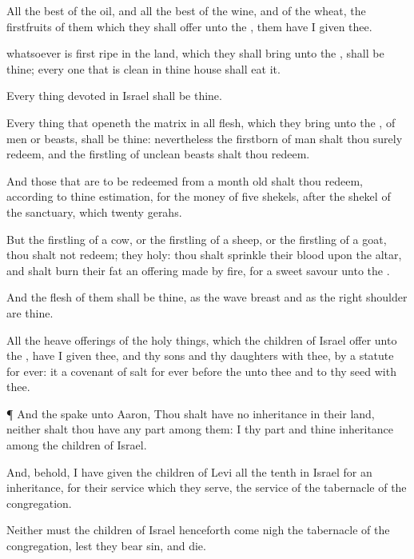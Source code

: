 {All the
best of the
oil, and all the
best of the
wine, and of the
wheat, the
firstfruits of them which they shall
offer unto the
{}, them have I
given thee.

 whatsoever is first
ripe in the
land, which they shall
bring unto the
{}, shall be thine; every one that is
clean in thine
house shall
eat
{} it.

Every thing
devoted in
Israel shall be thine.

Every thing that
openeth the
matrix in all
flesh, which they
bring unto the
{},
{} of
men or
beasts, shall be thine: nevertheless the
firstborn of
man shalt thou
surely
redeem, and the
firstling of
unclean
beasts shalt thou
redeem.

And those that are to be
redeemed from a
month
old shalt thou
redeem, according to thine
estimation, for the
money of
five
shekels, after the
shekel of the
sanctuary, which
{}
twenty
gerahs.

But the
firstling of a
cow, or the
firstling of a
sheep, or the
firstling of a
goat, thou shalt not
redeem; they
{}
holy: thou shalt
sprinkle their
blood upon the
altar, and shalt
burn their
fat
{} an offering made by
fire, for a
sweet
savour unto the
{}.

And the
flesh of them shall be thine, as the
wave
breast and as the
right
shoulder are thine.

All the heave
offerings of the holy
things, which the
children of
Israel
offer unto the
{}, have I
given thee, and thy
sons and thy
daughters with thee, by a
statute for
ever: it
{} a
covenant of
salt for
ever
before the
{} unto thee and to thy
seed with thee.


\par }{\PP {}¶ And the
{}
spake unto
Aaron, Thou shalt have no
inheritance in their
land, neither shalt thou have any
part
among them: I
{} thy
part and thine
inheritance
among the
children of
Israel.

And, behold, I have
given the
children of
Levi all the
tenth in
Israel for an
inheritance,
for their
service which they
serve,
{} the
service of the
tabernacle of the
congregation.

Neither must the
children of
Israel
henceforth come
nigh the
tabernacle of the
congregation, lest they
bear
sin, and
die.

}
